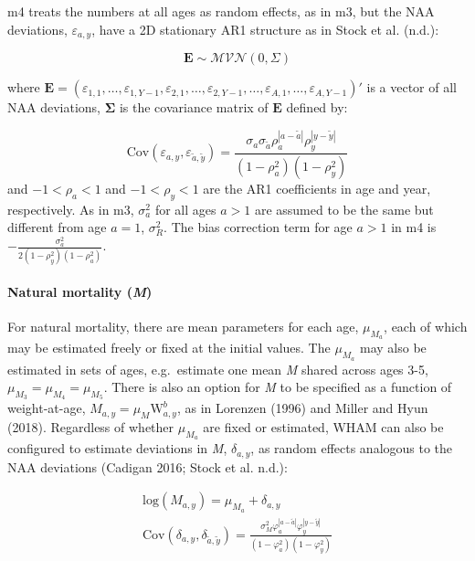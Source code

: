 \documentclass[]{article}
\let\oldparagraph\paragraph
\renewcommand{\paragraph}[1]{\oldparagraph{#1}\mbox{}}
\begin{document}
m4 treats the numbers at all ages as random effects, as in m3, but the
NAA deviations, \(\varepsilon_{a,y}\), have a 2D stationary AR1
structure as in Stock et al. (n.d.):

\[\mathbf{E} \sim \mathcal{MVN} \left( 0, \Sigma \right)\]

where
\(\mathbf{E} = (\varepsilon_{1,1}, \ldots, \varepsilon_{1,Y-1}, \varepsilon_{2,1}, \ldots, \varepsilon_{2,Y-1}, \ldots, \varepsilon_{A,1}, \ldots, \varepsilon_{A,Y-1})'\)
is a vector of all NAA deviations, \(\boldsymbol{\Sigma}\) is the
covariance matrix of \(\mathbf{E}\) defined by:

\[ \text{Cov} \left( \varepsilon_{a,y}, \varepsilon_{\tilde{a},\tilde{y}} \right) = \frac{\sigma_a \sigma_{\tilde{a}} \rho^{|a-\tilde{a}|}_{a} \rho^{|y-\tilde{y}|}_{y}}{\left(1-\rho^2_{a}\right) \left(1-\rho^2_{y}\right)}\]
and \(-1<\rho_a<1\) and \(-1<\rho_y<1\) are the AR1 coefficients in age
and year, respectively. As in m3, \(\sigma^2_a\) for all ages \(a > 1\)
are assumed to be the same but different from age \(a = 1\),
\(\sigma^2_R\). The bias correction term for age \(a > 1\) in m4 is
\(- \frac{\sigma^2_a}{2 (1-\rho^2_y)(1-\rho^2_a)}\).

\hypertarget{natural-mortality-m}{%
\paragraph{\texorpdfstring{Natural mortality
(\emph{M})}{Natural mortality (M)}}\label{natural-mortality-m}}

For natural mortality, there are mean parameters for each age,
\(\mu_{M_a}\), each of which may be estimated freely or fixed at the
initial values. The \(\mu_{M_a}\) may also be estimated in sets of ages,
e.g.~estimate one mean \emph{M} shared across ages 3-5,
\(\mu_{M_3} = \mu_{M_4} = \mu_{M_5}\). There is also an option for
\emph{M} to be specified as a function of weight-at-age,
\(M_{a,y} = \mu_M \text{W}^b_{a,y}\), as in Lorenzen (1996) and Miller
and Hyun (2018). Regardless of whether \(\mu_{M_a}\) are fixed or
estimated, WHAM can also be configured to estimate deviations in
\emph{M}, \(\delta_{a,y}\), as random effects analogous to the NAA
deviations (Cadigan 2016; Stock et al. n.d.):

\begin{equation}
  \begin{array}{cc}
    \text{log}\left( M_{a,y} \right) = \mu_{M_a} + \delta_{a,y} \\
    \text{Cov} \left( \delta_{a,y}, \delta_{\tilde{a},\tilde{y}} \right) = \frac{\sigma^2_M \varphi^{|a-\tilde{a}|}_{a} \varphi^{|y-\tilde{y}|}_{y}}{\left(1-\varphi^2_{a}\right) \left(1-\varphi^2_{y}\right)}
  \end{array}
\end{equation}
\end{document}
